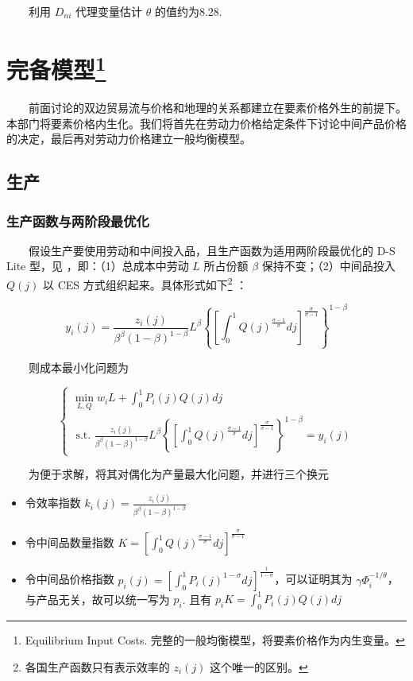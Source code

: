 \documentclass[
]{article}
\providecommand{\tightlist}{%
  \setlength{\itemsep}{0pt}\setlength{\parskip}{0pt}}
\begin{document}
　　利用 \(D_{ni}\) 代理变量估计 \(\theta\) 的值约为8.28.

\hypertarget{ux5b8cux5907ux6a21ux578b}{%
\section[完备模型]{\texorpdfstring{完备模型\footnote{Equilibrium Input Costs. 完整的一般均衡模型，将要素价格作为内生变量。}}{完备模型}}\label{ux5b8cux5907ux6a21ux578b}}

　　前面讨论的双边贸易流与价格和地理的关系都建立在要素价格外生的前提下。本部门将要素价格内生化。我们将首先在劳动力价格给定条件下讨论中间产品价格的决定，最后再对劳动力价格建立一般均衡模型。

\hypertarget{ux751fux4ea7}{%
\subsection{生产}\label{ux751fux4ea7}}

\hypertarget{ux751fux4ea7ux51fdux6570ux4e0eux4e24ux9636ux6bb5ux6700ux4f18ux5316}{%
\subsubsection{生产函数与两阶段最优化}\label{ux751fux4ea7ux51fdux6570ux4e0eux4e24ux9636ux6bb5ux6700ux4f18ux5316}}

　　假设生产要使用劳动和中间投入品，且生产函数为适用两阶段最优化的 D-S Lite 型，见 \citet{DS1977} ，即：（1）总成本中劳动 \(L\) 所占份额 \(\beta\) 保持不变；（2）中间品投入 \(Q(j)\) 以 CES 方式组织起来。具体形式如下\footnote{各国生产函数只有表示效率的 \(z_i(j)\) 这个唯一的区别。} ：

\[
y_{i}(j)=\frac{z_{i}(j)}{\beta^{\beta}(1-\beta)^{1-\beta}} L^{\beta}\left\{\left[\int_{0}^{1} Q(j)^{\frac{\sigma-1}{\sigma}} d j\right]^{\frac{\sigma}{\sigma-1}}\right\}^{1-\beta}
\]

　　则成本最小化问题为

\[
\left\{\begin{array}{c}
{\min_{L, Q} w_{i}L + \int_{0}^{1} P_{i}(j)Q(j) d j} \\ {\text { s.t. }\frac{z_{i}(j)}{\beta^{\beta}(1-\beta)^{1-\beta}} L^{\beta}\left\{\left[\int_{0}^{1} Q(j)^{\frac{\sigma-1}{\sigma}} d j\right]^{\frac{\sigma}{\sigma-1}}\right\}^{1-\beta}=y_{i}(j)}
\end{array}\right.
\]

　　为便于求解，将其对偶化为产量最大化问题，并进行三个换元

\begin{itemize}
\tightlist
\item
  令效率指数 \(k_{i}(j)=\frac{z_{i}(j)}{\beta^{\beta}(1-\beta)^{1-\beta}}\)
\item
  令中间品数量指数 \(K=\left[\int_{0}^{1} Q(j)^{\frac{\sigma-1}{\sigma}} d j\right]^{\frac{\sigma}{\sigma-1}}\)
\item
  令中间品价格指数 \(p_{i}(j)=\left[\int_{0}^{1} P_{i}(j)^{1-\sigma} d j\right]^{\frac{1}{1-\sigma}}\)，可以证明其为 \(\gamma \Phi_{i}^{-1 / \theta}\)，与产品无关，故可以统一写为 \(p_{i}\). 且有 \(p_{i}K=\int_{0}^{1} P_{i}(j)Q(j) d j\)
\end{itemize}
\end{document}
